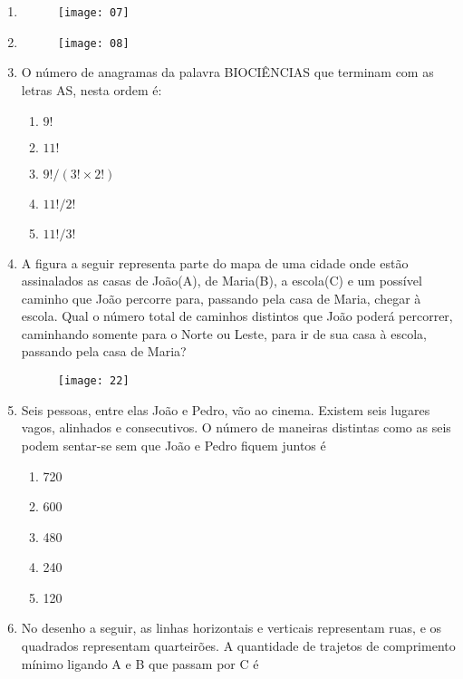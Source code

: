 \documentclass[twocolumn,oneside,a4paper,12pt]{article}
\begin{document}
\begin{enumerate}
\item

	\begin{figure}[!tbh]
	\center
	\texttt{[image: 07]}
	\end{figure}

\item

	\begin{figure}[!tbh]
	\center
	\texttt{[image: 08]}
	\end{figure}


\item O número de anagramas da palavra BIOCIÊNCIAS que terminam com as letras AS, nesta ordem é:
\begin{enumerate}
\item $9!$
\item $11!$
\item $9!/(3! \times 2!)$
\item $11!/2!$
\item $11!/3!$
\end{enumerate}

\item A figura a seguir representa parte do mapa de uma cidade onde estão assinalados as casas de João(A), de Maria(B), a escola(C) e um possível caminho que João percorre para, passando pela casa de Maria, chegar à escola. Qual o número total de caminhos distintos que João poderá percorrer, caminhando somente para o Norte ou Leste, para ir de sua casa à escola, passando pela casa de Maria?

	\begin{figure}[!tbh]
	\center
	\texttt{[image: 22]}
	\end{figure}

\item Seis pessoas, entre elas João e Pedro, vão ao cinema. Existem seis lugares vagos, alinhados e consecutivos. O número de maneiras distintas como as seis podem sentar-se sem que João e Pedro fiquem juntos é
\begin{enumerate}
\item 720
\item 600
\item 480
\item 240
\item 120
\end{enumerate}

\item No desenho a seguir, as linhas horizontais e verticais representam ruas, e os quadrados representam quarteirões. A quantidade de trajetos de comprimento mínimo ligando A e B que  passam por C é


\end{enumerate}
\end{document}
